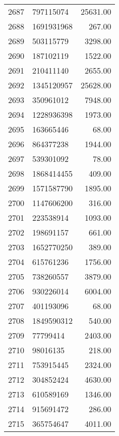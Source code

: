 \begin{table}[ht]
\begin{tabular}{rlr}
  2687 & 797115074 & 25631.00 \\ 
  2688 & 1691931968 & 267.00 \\ 
  2689 & 503115779 & 3298.00 \\ 
  2690 & 187102119 & 1522.00 \\ 
  2691 & 210411140 & 2655.00 \\ 
  2692 & 1345120957 & 25628.00 \\ 
  2693 & 350961012 & 7948.00 \\ 
  2694 & 1228936398 & 1973.00 \\ 
  2695 & 163665446 & 68.00 \\ 
  2696 & 864377238 & 1944.00 \\ 
  2697 & 539301092 & 78.00 \\ 
  2698 & 1868414455 & 409.00 \\ 
  2699 & 1571587790 & 1895.00 \\ 
  2700 & 1147606200 & 316.00 \\ 
  2701 & 223538914 & 1093.00 \\ 
  2702 & 198691157 & 661.00 \\ 
  2703 & 1652770250 & 389.00 \\ 
  2704 & 615761236 & 1756.00 \\ 
  2705 & 738260557 & 3879.00 \\ 
  2706 & 930226014 & 6004.00 \\ 
  2707 & 401193096 & 68.00 \\ 
  2708 & 1849590312 & 540.00 \\ 
  2709 & 77799414 & 2403.00 \\ 
  2710 & 98016135 & 218.00 \\ 
  2711 & 753915445 & 2324.00 \\ 
  2712 & 304852424 & 4630.00 \\ 
  2713 & 610589169 & 1346.00 \\ 
  2714 & 915691472 & 286.00 \\ 
  2715 & 365754647 & 4011.00 \\ 
   \hline
\end{tabular}
\end{table}

